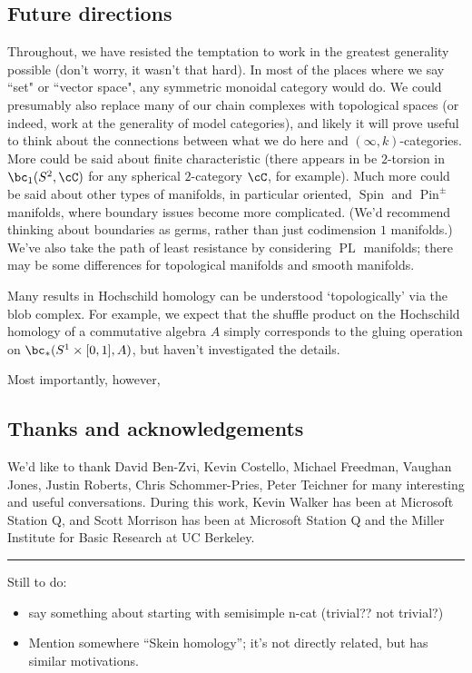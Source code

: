 \subsection{Future directions}
\label{sec:future}
Throughout, we have resisted the temptation to work in the greatest generality possible (don't worry, it wasn't that hard). 
In most of the places where we say ``set" or ``vector space", any symmetric monoidal category would do. We could presumably also replace many of our chain complexes with topological spaces (or indeed, work at the generality of model categories), and likely it will prove useful to think about the connections between what we do here and $(\infty,k)$-categories.
More could be said about finite characteristic (there appears in be $2$-torsion in $\bc_1(S^2, \cC)$ for any spherical $2$-category $\cC$, for example). Much more could be said about other types of manifolds, in particular oriented, $\operatorname{Spin}$ and $\operatorname{Pin}^{\pm}$ manifolds, where boundary issues become more complicated. (We'd recommend thinking about boundaries as germs, rather than just codimension $1$ manifolds.) We've also take the path of least resistance by considering $\operatorname{PL}$ manifolds; there may be some differences for topological manifolds and smooth manifolds.

Many results in Hochschild homology can be understood `topologically' via the blob complex. For example, we expect that the shuffle product on the Hochschild homology of a commutative algebra $A$ simply corresponds to the gluing operation on $\bc_*(S^1 \times [0,1], A)$, but haven't investigated the details.

Most importantly, however,  


\subsection{Thanks and acknowledgements}
We'd like to thank David Ben-Zvi, Kevin Costello, 
Michael Freedman, Vaughan Jones, Justin Roberts, Chris Schommer-Pries, Peter Teichner  for many interesting and useful conversations. 
During this work, Kevin Walker has been at Microsoft Station Q, and Scott Morrison has been at Microsoft Station Q and the Miller Institute for Basic Research at UC Berkeley.


\medskip\hrule\medskip

Still to do:
\begin{itemize}
\item say something about starting with semisimple n-cat (trivial?? not trivial?)
\item Mention somewhere \cite{MR1624157} ``Skein homology''; it's not directly related, but has similar motivations.
\end{itemize}

